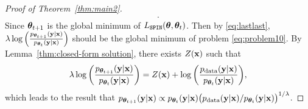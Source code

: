 \documentclass{article}
\newcommand{\method}{\texttt{SPIN}}
\begin{document}
\begin{proof}[Proof of Theorem~\ref{thm:main2}]
\begin{align}
. \label{eq:lastlast}
\end{align}
Since $\bm{\theta}_{t+1}$ is the global minimum of $L_{\method}(\btheta, \btheta_t)$. Then by \eqref{eq:lastlast}, $\lambda\log\Big(\frac{p_{\bm{\theta}_{t+1}}(\mathbf{y}|\mathbf{x})}{p_{\bm{\theta}_{t}}(\mathbf{y}|\mathbf{x})}\Big)$ should be the global minimum of problem \eqref{eq:problem10}. By Lemma~\ref{thm:closed-form solution}, there exists $Z(\mathbf{x})$ such that 
\begin{align*}
\lambda\log\bigg(\frac{p_{\bm{\theta}_{t+1}}(\mathbf{y}|\mathbf{x})}{p_{\bm{\theta}_{t}}(\mathbf{y}|\mathbf{x})}\bigg) = Z(\mathbf{x}) + \log\bigg(\frac{p_{\mathrm{data}}(\mathbf{y}|\mathbf{x})}{p_{\bm{\theta}_{t}}(\mathbf{y}|\mathbf{x})}\bigg), 
\end{align*}
which leads to the result that $p_{\bm{\theta}_{t+1}}(\mathbf{y}|\mathbf{x}) \propto p_{\bm{\theta}_{t}}(\mathbf{y}|\mathbf{x})\big(p_{\mathrm{data}}(\mathbf{y}|\mathbf{x})/p_{\bm{\theta}_{t}}(\mathbf{y}|\mathbf{x}) \big)^{1/\lambda}$.

\end{proof}
\end{document}

